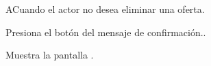 \begin{UCtrayectoriaA}{A}{Cuando el actor no desea eliminar una oferta.}

	\UCpaso [\UCactor] Presiona el botón   del mensaje de confirmación..

	\UCpaso Muestra la pantalla .   
\end{UCtrayectoriaA}
